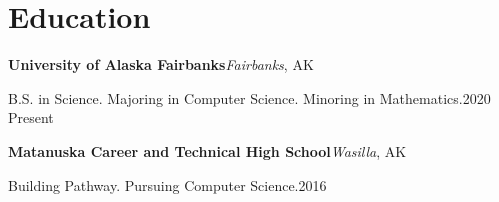﻿\section{Education}

{\textbf{University of Alaska Fairbanks}}\hfill{\textit{Fairbanks}, AK}

{B.S. in Science. Majoring in Computer Science. Minoring in Mathematics.}\hfill{2020 \textendash Present}

\bigbreak

{\textbf{Matanuska Career and Technical High School}}\hfill{\textit{Wasilla}, AK}

{Building Pathway. Pursuing Computer Science.}\hfill{2016 }
